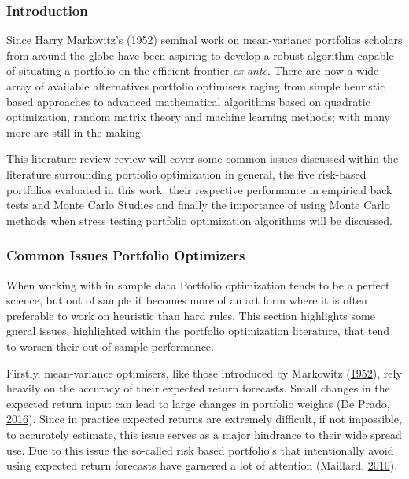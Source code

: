 \documentclass[11pt,preprint, authoryear]{elsarticle}
\numberwithin{equation}{section}
\numberwithin{figure}{section}
\numberwithin{table}{section}
\begin{document}
\hypertarget{introduction-1}{%
\subsubsection{Introduction}\label{introduction-1}}

Since Harry Markovitz's (1952) seminal work on mean-variance portfolios
scholars from around the globe have been aspiring to develop a robust
algorithm capable of situating a portfolio on the efficient frontier
\emph{ex ante}. There are now a wide array of available alternatives
portfolio optimisers raging from simple heuristic based approaches to
advanced mathematical algorithms based on quadratic optimization, random
matrix theory and machine learning methods; with many more are still in
the making.

This literature review review will cover some common issues discussed
within the literature surrounding portfolio optimization in general, the
five risk-based portfolios evaluated in this work, their respective
performance in empirical back tests and Monte Carlo Studies and finally
the importance of using Monte Carlo methods when stress testing
portfolio optimization algorithms will be discussed.

\hypertarget{common-issues-portfolio-optimizers}{%
\subsubsection{Common Issues Portfolio
Optimizers}\label{common-issues-portfolio-optimizers}}

When working with in sample data Portfolio optimization tends to be a
perfect science, but out of sample it becomes more of an art form where
it is often preferable to work on heuristic than hard rules. This
section highlights some gneral issues, highlighted within the portfolio
optimization literature, that tend to worsen their out of sample
performance.

Firstly, mean-variance optimisers, like those introduced by Markowitz
(\protect\hyperlink{ref-markowitz}{1952}), rely heavily on the accuracy
of their expected return forecasts. Small changes in the expected return
input can lead to large changes in portfolio weights (De Prado,
\protect\hyperlink{ref-lopez}{2016}). Since in practice expected returns
are extremely difficult, if not impossible, to accurately estimate, this
issue serves as a major hindrance to their wide spread use. Due to this
issue the so-called risk based portfolio's that intentionally avoid
using expected return forecasts have garnered a lot of attention
(Maillard, \protect\hyperlink{ref-maillard2010}{2010}).
\end{document}

